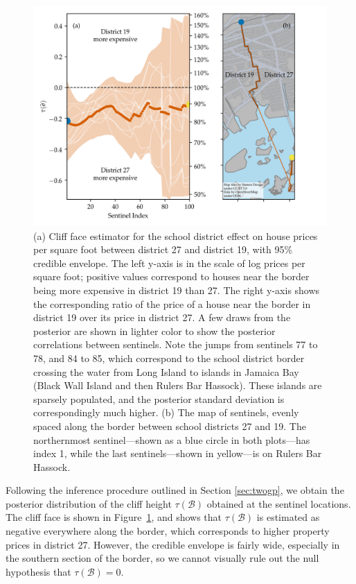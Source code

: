 \documentclass[letter,12pt]{article}
\newcommand{\border}{\mathcal{B}}
\begin{document}
\begin{figure}[tbp]
    \centering
    \includegraphics{../NYC/NYC_plots/NYC_cliff_face.png}
    \caption{\label{fig:NYC_cliff_face}
        (a)
        Cliff face estimator for the school district effect on house prices per square foot between district 27 and district 19, with 95\% credible envelope.
        The left y-axis is in the scale of log prices per square foot; positive values correspond to houses near the border being more expensive in district 19 than 27.
        The right y-axis shows the corresponding ratio of the price of a house near the border in district 19 over its price in district 27.
        A few draws from the posterior are shown in lighter color to show the posterior correlations between sentinels.
        Note the jumps from sentinels 77 to 78, and 84 to 85, which correspond to the school district border crossing the water from Long Island to islands in Jamaica Bay (Black Wall Island and then Rulers Bar Hassock).
        These islands are sparsely populated, and the posterior standard deviation is correspondingly much higher.
        (b)
        The map of sentinels, evenly spaced along the border between school districts 27 and 19.
    The northernmost sentinel---shown as a blue circle in both plots---has index 1, while the last sentinels---shown in yellow---is on Rulers Bar Hassock.}
\end{figure}



Following the inference procedure outlined in Section \ref{sec:twogp}, we obtain the posterior distribution of the cliff height \(\tau(\border)\) obtained at the sentinel locations.
The cliff face is shown in Figure~\ref{fig:NYC_cliff_face}, and shows that \(\tau(\border)\) is estimated as negative everywhere along the border, which corresponds to higher property prices in district 27.
However, the credible envelope is fairly wide, especially in the southern section of the border, so we cannot visually rule out the null hypothesis that \(\tau(\border)=0\).
\end{document}
